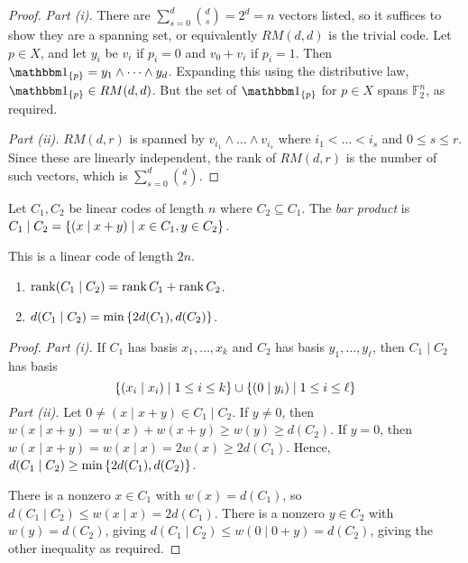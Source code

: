 \begin{proof}
    \emph{Part (i).}
    There are \( \sum_{s=0}^d \binom{d}{s} = 2^d = n \) vectors listed, so it suffices to show they are a spanning set, or equivalently \( RM(d,d) \) is the trivial code.
    Let \( p \in X \), and let \( y_i \) be \( v_i \) if \( p_i = 0 \) and \( v_0 + v_i \) if \( p_i = 1 \).
    Then \( \mathbbm 1_{\qty{p}} = y_1 \wedge \dots \wedge y_d \).
    Expanding this using the distributive law, \( \mathbbm 1_{\qty{p}} \in RM(d,d) \).
    But the set of \( \mathbbm 1_{\qty{p}} \) for \( p \in X \) spans \( \mathbb F_2^n \), as required.

    \emph{Part (ii).}
    \( RM(d,r) \) is spanned by \( v_{i_1} \wedge \dots \wedge v_{i_s} \) where \( i_1 < \dots < i_s \) and \( 0 \leq s \leq r \).
    Since these are linearly independent, the rank of \( RM(d,r) \) is the number of such vectors, which is \( \sum_{s=0}^d \binom{d}{s} \).
\end{proof}
\begin{definition}
    Let \( C_1, C_2 \) be linear codes of length \( n \) where \( C_2 \subseteq C_1 \).
    The \emph{bar product} is \( C_1 \mid C_2 = \qty{(x \mid x + y) \mid x \in C_1, y \in C_2} \).
\end{definition}
This is a linear code of length \( 2n \).
\begin{lemma}
    \begin{enumerate}
        \item \( \rank (C_1 \mid C_2) = \rank C_1 + \rank C_2 \).
        \item \( d(C_1 \mid C_2) = \min \qty{2d(C_1), d(C_2)} \).
    \end{enumerate}
\end{lemma}
\begin{proof}
    \emph{Part (i).}
    If \( C_1 \) has basis \( x_1, \dots, x_k \) and \( C_2 \) has basis \( y_1, \dots, y_\ell \), then \( C_1 \mid C_2 \) has basis
    \[ \qty{(x_i \mid x_i) \mid 1 \leq i \leq k} \cup \qty{(0 \mid y_i) \mid 1 \leq i \leq \ell} \]
    \emph{Part (ii).}
    Let \( 0 \neq (x \mid x + y) \in C_1 \mid C_2 \).
    If \( y \neq 0 \), then \( w(x \mid x + y) = w(x) + w(x + y) \geq w(y) \geq d(C_2) \).
    If \( y = 0 \), then \( w(x \mid x + y) = w(x \mid x) = 2w(x) \geq 2d(C_1) \).
    Hence, \( d(C_1 \mid C_2) \geq \min\qty{2d(C_1), d(C_2)} \).

    There is a nonzero \( x \in C_1 \) with \( w(x) = d(C_1) \), so \( d(C_1 \mid C_2) \leq w(x \mid x) = 2d(C_1) \).
    There is a nonzero \( y \in C_2 \) with \( w(y) = d(C_2) \), giving \( d(C_1 \mid C_2) \leq w(0 \mid 0 + y) = d(C_2) \), giving the other inequality as required.
\end{proof}
